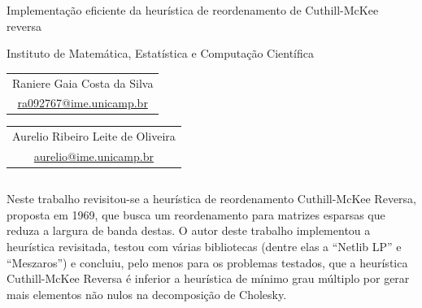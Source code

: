 \documentclass[]{beamer}
\begin{document}
\begin{frame}[t,fragile]
  \begin{center}
    \begin{huge}
      Implementa\c{c}\~{a}o eficiente da heur\'{i}stica de reordenamento de Cuthill-McKee reversa

      \vspace{20pt}
      Instituto de Matemática, Estatística e Computação Científica
    \end{huge}

    \vspace{20pt}
    \begin{Large}
      \begin{tabular}[]{c}
        Raniere Gaia Costa da Silva \\
        \url{ra092767@ime.unicamp.br}
      \end{tabular} \hspace{5cm}
      \begin{tabular}[]{c}
        Aurelio Ribeiro Leite de Oliveira \\
        \url{aurelio@ime.unicamp.br}
      \end{tabular}
    \end{Large}
  \end{center}
  \vspace{20pt}

  \begin{columns}[t]
    \begin{column}{0.3\textwidth}
      Neste trabalho revisitou-se a heurística de reordenamento Cuthill-McKee Reversa,
      proposta em 1969, que busca um reordenamento para matrizes esparsas que reduza a
      largura de banda destas. O autor deste trabalho implementou a heurística
      revisitada, testou com várias bibliotecas (dentre elas a ``Netlib LP'' e
      ``Meszaros'') e concluiu, pelo menos para os problemas testados, que a
      heurística Cuthill-McKee Reversa é inferior a heurística de mínimo grau
      múltiplo por gerar mais elementos não nulos na decomposição de Cholesky.


\end{column}
\end{columns}
\end{frame}
\end{document}
